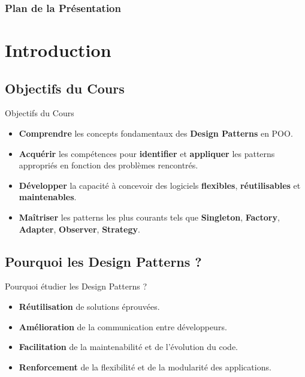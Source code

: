 \documentclass[aspectratio=169]{beamer}
\begin{document}
\begin{frame}
    \titlepage
\end{frame}

\begin{frame}
    \frametitle{Plan de la Présentation}
    \scriptsize
    \tableofcontents[hideallsubsections]
\end{frame}
\section{Introduction}
    \subsection{Objectifs du Cours}

\begin{frame}{Objectifs du Cours}
    \begin{itemize}
        \item \textbf{Comprendre} les concepts fondamentaux des \textbf{Design Patterns} en POO.
        \item \textbf{Acquérir} les compétences pour \textbf{identifier} et \textbf{appliquer} les patterns appropriés en fonction des problèmes rencontrés.
        \item \textbf{Développer} la capacité à concevoir des logiciels \textbf{flexibles}, \textbf{réutilisables} et \textbf{maintenables}.
        \item \textbf{Maîtriser} les patterns les plus courants tels que \textbf{Singleton}, \textbf{Factory}, \textbf{Adapter}, \textbf{Observer}, \textbf{Strategy}.
    \end{itemize}
\end{frame}    
    \subsection{Pourquoi les Design Patterns ?}

\begin{frame}{Pourquoi étudier les Design Patterns ?}
    \begin{itemize}
        \item \textbf{Réutilisation} de solutions éprouvées.
        \item \textbf{Amélioration} de la communication entre développeurs.
        \item \textbf{Facilitation} de la maintenabilité et de l'évolution du code.
        \item \textbf{Renforcement} de la flexibilité et de la modularité des applications.
    \end{itemize}
\end{frame}
\end{document}
